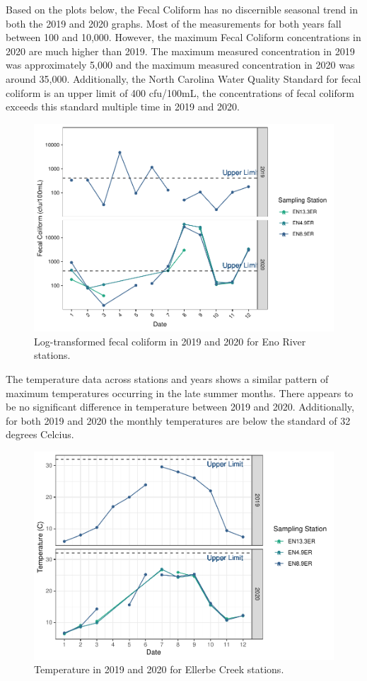 \documentclass[
  12pt,
]{article}
\begin{document}
Based on the plots below, the Fecal Coliform has no discernible seasonal
trend in both the 2019 and 2020 graphs. Most of the measurements for
both years fall between 100 and 10,000. However, the maximum Fecal
Coliform concentrations in 2020 are much higher than 2019. The maximum
measured concentration in 2019 was approximately 5,000 and the maximum
measured concentration in 2020 was around 35,000. Additionally, the
North Carolina Water Quality Standard for fecal coliform is an upper
limit of 400 cfu/100mL, the concentrations of fecal coliform exceeds
this standard multiple time in 2019 and 2020.

\begin{figure}
\centering
\includegraphics{August_Lindborg_ENV872_Project_files/figure-latex/unnamed-chunk-7-1.pdf}
\caption{Log-transformed fecal coliform in 2019 and 2020 for Eno River
stations.}
\end{figure}

The temperature data across stations and years shows a similar pattern
of maximum temperatures occurring in the late summer months. There
appears to be no significant difference in temperature between 2019 and
2020. Additionally, for both 2019 and 2020 the monthly temperatures are
below the standard of 32 degrees Celcius.

\begin{figure}
\centering
\includegraphics{August_Lindborg_ENV872_Project_files/figure-latex/unnamed-chunk-8-1.pdf}
\caption{Temperature in 2019 and 2020 for Ellerbe Creek stations.}
\end{figure}
\end{document}
